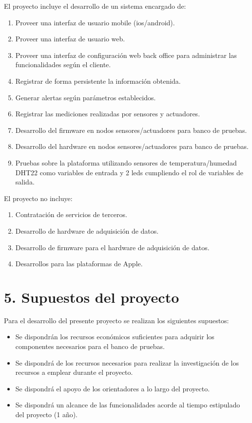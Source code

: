 \documentclass[
11pt, %
]{charter}
\begin{document}
El proyecto incluye el desarrollo de un sistema encargado de:
\begin{enumerate}
\item Proveer una interfaz de usuario mobile (ios/android).
\item Proveer una interfaz de usuario web.
\item Proveer una interfaz de configuración web back office para administrar las funcionalidades según el cliente.
\item Registrar de forma persistente la información obtenida.
\item Generar alertas según parámetros establecidos.
\item Registrar las mediciones realizadas por sensores y actuadores.
\item Desarrollo del firmware en nodos sensores/actuadores para banco de pruebas.
\item Desarrollo del hardware en nodos sensores/actuadores para banco de pruebas.
\item Pruebas sobre la plataforma utilizando sensores de temperatura/humedad DHT22 como variables de entrada y 2 leds cumpliendo el rol de variables de salida.
\end{enumerate}

El proyecto no incluye:
\begin{enumerate}
\item Contratación de servicios de terceros.
\item Desarrollo de hardware de adquisición de datos.
\item Desarrollo de firmware para el hardware de adquisición de datos.
\item Desarrollos para las plataformas de Apple.
\end{enumerate}

\section{5. Supuestos del proyecto}

Para el desarrollo del presente proyecto se realizan los siguientes supuestos:
\begin{itemize}
	\item Se dispondrán los recursos económicos suficientes para adquirir los componentes necesarios para el banco de pruebas.
	\item Se dispondrá de los recursos necesarios para realizar la investigación de los recursos a emplear durante el proyecto.
	 \item Se dispondrá el apoyo de los orientadores a lo largo del proyecto.
	 \item Se dispondrá un alcance de las funcionalidades acorde al tiempo estipulado del proyecto (1 año).
\end{itemize}
\end{document}
